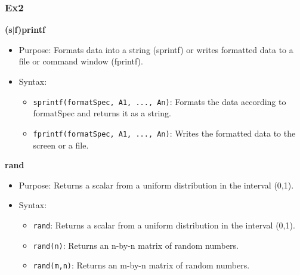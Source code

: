 \documentclass[
	11pt, %
]{beamer}
\begin{document}
\begin{frame}
    \frametitle{Ex2}

	\textbf{(s$|$f)printf}
	
    \begin{itemize}
        \item Purpose: Formats data into a string (sprintf) or writes formatted data to a file or command window (fprintf).
        \item Syntax:
            \begin{itemize}
                \item \texttt{sprintf(formatSpec, A1, ..., An)}: Formats the data according to formatSpec and returns it as a string.
                \item \texttt{fprintf(formatSpec, A1, ..., An)}: Writes the formatted data to the screen or a file.
            \end{itemize}
    \end{itemize}
    \smallskip
    \textbf{rand} 
	
    \begin{itemize}
        \item Purpose: Returns a scalar from a uniform distribution in the interval (0,1).
        \item Syntax:
            \begin{itemize}
                \item \texttt{rand}: Returns a scalar from a uniform distribution in the interval (0,1).
                \item \texttt{rand(n)}: Returns an n-by-n matrix of random numbers.
                \item \texttt{rand(m,n)}: Returns an m-by-n matrix of random numbers.
            \end{itemize}
    \end{itemize}
\end{frame}

\end{document}
